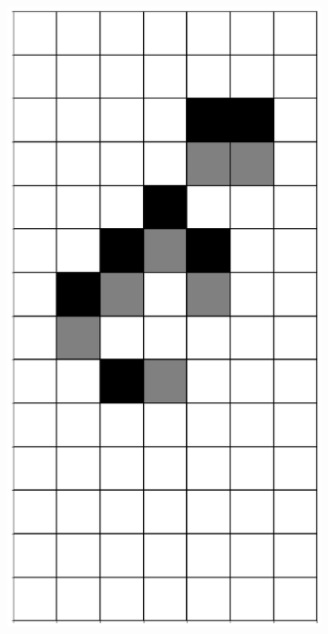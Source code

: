 \documentclass[12pt]{article}
\numberwithin{figure}{section} %
\begin{document}
\begin{figure}[H]
\begin{subfigure}{0.18\textwidth}
     		\centering
     		\includegraphics[width=\linewidth]{Section4/16.3}
     		\subcaption{}
   	\end{subfigure}
        	\begin{subfigure}{0.18\textwidth}
     		\centering

\end{subfigure}
\end{figure}
\end{document}
